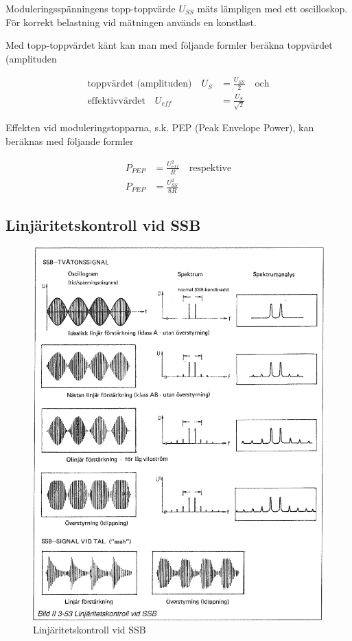 Moduleringsspänningens topp-topp\-värde \(U_{SS}\) mäts lämpligen med
ett oscilloskop. För korrekt belastning vid mätningen används en
konstlast.

Med topp-toppvärdet känt kan man med följande formler beräkna
toppvärdet (amplituden

\begin{align*}
  \text{toppvärdet (amplituden)} \quad
  U_S & = \frac{U_{SS}}{2}
  \quad \text{och} \\
  \text{effektivvärdet} \quad
  U_{eff} & = \frac{U_S}{\sqrt{2}}
\end{align*}

Effekten vid moduleringstopparna, s.k.  PEP (Peak Envelope Power), kan
beräknas med följande formler

\begin{align*}
  P_{PEP} &= \frac{U_{eff}^2}{R} \quad \text{respektive} \\
  P_{PEP} &= \frac{U_{SS}^2}{8R}
\end{align*}

\subsection{Linjäritetskontroll vid SSB}

\begin{figure}
\includegraphics[width=\textwidth]{images/bild_2_3-53}
\caption{Linjäritetskontroll vid SSB}
\label{fig:BildII3-53}
\end{figure}

